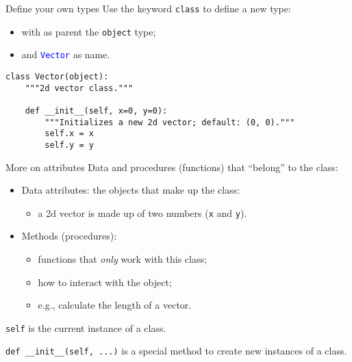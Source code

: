 \documentclass{beamer}
\begin{document}
\begin{frame}[fragile]{Define your own types}
Use the keyword \texttt{class} to define a new type:
\begin{itemize}
\item with as parent the \texttt{object} type;
\item and \textcolor{blue}{\texttt{Vector}} as name.
\end{itemize}

\bigskip

\begin{verbatim}
class Vector(object):
    """2d vector class."""

    def __init__(self, x=0, y=0):
        """Initializes a new 2d vector; default: (0, 0)."""
        self.x = x
        self.y = y
\end{verbatim}
\end{frame}

\begin{frame}{More on attributes}
Data and procedures (functions) that ``belong'' to the class:

\begin{itemize}
\item \textcolor{pms280_compl}{Data} attributes: the objects that make up
the class:
\begin{itemize}
\item a 2d vector is made up of two numbers (\texttt{x} and
\texttt{y}).
\end{itemize}

\item \textcolor{pms280_compl}{Methods} (procedures):
\begin{itemize}
\item functions that \emph{only} work with this class;
\item how to interact with the object;
\item e.g., calculate the length of a vector.
\end{itemize}

\end{itemize}

\bigskip

\texttt{self} is the current instance of a class.

\bigskip

\texttt{def __init__(self, ...)} is a special method to
create new instances of a class.
\end{frame}
\end{document}
